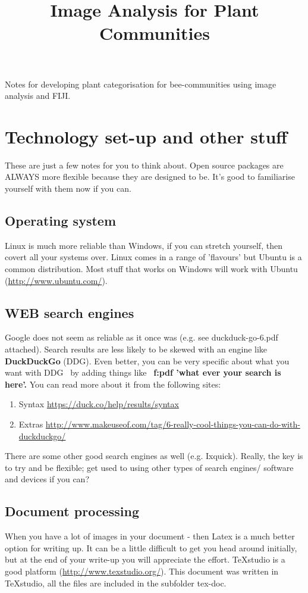 \documentclass[letterpaper]{article}
\title{Image Analysis for Plant Communities}
\begin{document}
\maketitle

Notes for developing plant categorisation for bee-communities using image analysis and FIJI.

\section{Technology set-up and other stuff}
These are just a few notes for you to think about. Open source packages are ALWAYS more flexible because they are designed to be. It's good to familiarise yourself with them now if you can.

\subsection {Operating system}
Linux is much more reliable than Windows, if you can stretch yourself, then covert all your systems over. Linux comes in a range of 'flavours' but Ubuntu is a common distribution. Most stuff that works on Windows will work with Ubuntu (\url{http://www.ubuntu.com/}).

\subsection {WEB search engines}
Google does not seem as reliable as it
once was (e.g. see duckduck-go-6.pdf attached). Search results are less likely to be skewed with an engine like \textbf{DuckDuckGo }(DDG). Even better, you can be very specific about what you want with DDG \ by adding things like \ \textbf{f:pdf
'what ever your search is here'. } You can read more about it from the following sites:
\begin{enumerate}
\item {Syntax} \url{https://duck.co/help/results/syntax}
\item {Extras} \url{http://www.makeuseof.com/tag/6-really-cool-things-you-can-do-with-duckduckgo/}
\end{enumerate}

There are some other good search engines as well (e.g. Ixquick). Really, the key is to try and be flexible; get used to
using other types of search engines/ software and devices if you can? 

\subsection{Document processing}
When you have a lot of images in your document - then Latex is a much better option for writing up. It can be a little difficult to get you head around initially, but at the end of your write-up you will appreciate the effort. TeXstudio is a good platform (\url{http://www.texstudio.org/}). This document was written in TeXstudio, all the files are included in the subfolder tex-doc.
\end{document}

